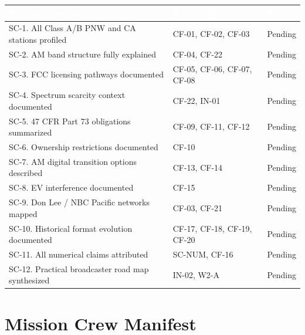 \documentclass[11pt,letterpaper]{article}
\newcommand{\tableheader}[1]{\textbf{\sffamily\textcolor{white}{#1}}}
\begin{document}
\begin{asciibox}
\begin{center}
\begin{tabularx}{\textwidth}{XL{3.5cm}C{1.8cm}}
\toprule
{}
\tableheader{Success Criterion} & \tableheader{Test ID(s)} & \tableheader{Status} \\
\midrule
SC-1. All Class A/B PNW and CA stations profiled & CF-01, CF-02, CF-03 & Pending \\
SC-2. AM band structure fully explained & CF-04, CF-22 & Pending \\
SC-3. FCC licensing pathways documented & CF-05, CF-06, CF-07, CF-08 & Pending \\
SC-4. Spectrum scarcity context documented & CF-22, IN-01 & Pending \\
SC-5. 47 CFR Part 73 obligations summarized & CF-09, CF-11, CF-12 & Pending \\
SC-6. Ownership restrictions documented & CF-10 & Pending \\
SC-7. AM digital transition options described & CF-13, CF-14 & Pending \\
SC-8. EV interference documented & CF-15 & Pending \\
SC-9. Don Lee / NBC Pacific networks mapped & CF-03, CF-21 & Pending \\
SC-10. Historical format evolution documented & CF-17, CF-18, CF-19, CF-20 & Pending \\
SC-11. All numerical claims attributed & SC-NUM, CF-16 & Pending \\
SC-12. Practical broadcaster road map synthesized & IN-02, W2-A & Pending \\
\bottomrule
\end{tabularx}
\end{center}

\section{Mission Crew Manifest}


\end{asciibox}
\end{document}
